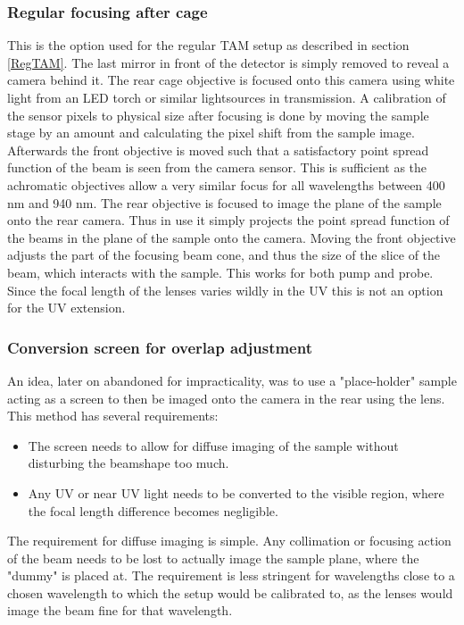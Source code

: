 \documentclass[twoside,openright]{scrreprt}
\begin{document}
\subsubsection{Regular focusing after cage}\label{regRearFocus}
This is the option used for the regular TAM setup as described in section \ref{RegTAM}. The last mirror in front of the detector is simply removed to reveal a camera behind it. The rear cage objective is focused onto this camera using white light from an LED torch or similar lightsources in transmission. A calibration of the sensor pixels to physical size after focusing is done by moving the sample stage by an amount and calculating the pixel shift from the sample image. Afterwards the front objective is moved such that a satisfactory point spread function of the beam is seen from the camera sensor. 
This is sufficient as the achromatic objectives allow a very similar focus for all wavelengths between 400 nm and 940 nm. The rear objective is focused to image the plane of the sample onto the rear camera. Thus in use it simply projects the point spread function of the beams in the plane of the sample onto the camera. Moving the front objective adjusts the part of the focusing beam cone, and thus the size of the slice of the beam, which interacts with the sample. This works for both pump and probe. Since the focal length of the lenses varies wildly in the UV this is not an option for the UV extension.
\subsubsection{Conversion screen for overlap adjustment}
An idea, later on abandoned for impracticality, was to use a "place-holder" sample acting as a screen to then be imaged onto the camera in the rear using the lens. This method has several requirements:
\begin{itemize}
\item The screen needs to allow for diffuse imaging of the sample without disturbing the beamshape too much.
\item Any UV or near UV light needs to be converted to the visible region, where the focal length difference becomes negligible.
\end{itemize}

The requirement for diffuse imaging is simple. Any collimation or focusing action of the beam needs to be lost to actually image the sample plane, where the "dummy" is placed at. The requirement is less stringent for wavelengths close to a chosen wavelength to which the setup would be calibrated to, as the lenses would image the beam fine for that wavelength.\\
\end{document}
